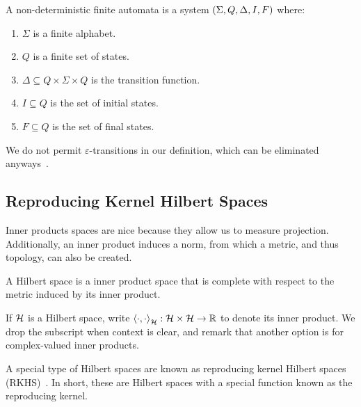 \documentclass[12pt]{article}
\begin{document}
\begin{definition}
  A non-deterministic finite automata is a system
  \(\left(\Sigma, Q, \Delta, I, F\right)\) where:

  \begin{enumerate}
    \item
      \(\Sigma\) is a finite alphabet.

    \item
      \(Q\) is a finite set of states.

    \item
      \(\Delta \subseteq Q \times \Sigma \times Q\)
      is the transition function.

    \item
      \(I \subseteq Q\) is the set of initial states.

    \item
      \(F \subseteq Q\) is the set of final states.

  \end{enumerate}
\end{definition}

We do not permit \(\varepsilon\)-transitions in our definition,
which can be eliminated anyways~\cite{savage1998models}.



\subsection{Reproducing Kernel Hilbert Spaces}

Inner products spaces are nice because they allow us to measure projection.
Additionally, an inner product induces a norm, from which a metric,
and thus topology, can also be created.

\begin{definition}
  A Hilbert space is a inner product space that is complete with respect
  to the metric induced by its inner product.
\end{definition}

If \(\mathcal{H}\) is a Hilbert space,
write
\(\left\langle\cdot, \cdot\right\rangle_{\mathcal{H}} : \mathcal{H} \times \mathcal{H} \to \mathbb{R}\)
to denote its inner product.
We drop the subscript when context is clear,
and remark that another option is for complex-valued inner products.

A special type of Hilbert spaces are known as
reproducing kernel Hilbert spaces (RKHS)~\cite{berlinet2011reproducing}.
In short,
these are Hilbert spaces with a special function known
as the reproducing kernel.
\end{document}
